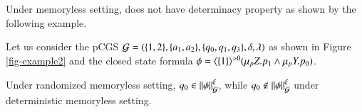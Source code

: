 Under memoryless setting, \pamc does not have determinacy property as shown by the following example.
\begin{example}
Let us consider the pCGS
$\mathcal{G}=(\{1,2\},\{a_1,a_2\},\{q_0,q_1,q_3\}, \delta,\lambda)$ as shown in Figure  \ref{fig-example2}
and the closed \pamc state formula $\phi=\langle{\{1\}}\rangle^{>0} (\mu_p Z. p_1 \wedge \mu_p Y. p_0)$.

Under randomized memoryless setting,  $q_0\in\|{\phi}\|_{\mathcal{G}}^\xi$, while $q_0\not\in\|{\phi}\|_{\mathcal{G}}^\xi$ under deterministic memoryless setting.
\end{example}

